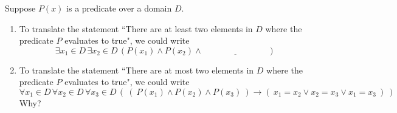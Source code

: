 
Suppose $P(x)$ is  a predicate over a domain $D$.
\begin{enumerate}
    \item To translate the statement
    ``There are at least two  elements in $D$
    where the predicate $P$ evaluates to true", we
    could  write
    \[
    \exists  x_1 \in D \, \exists x_2 \in D  \, (P(x_1) \wedge P(x_2) \wedge \underline{\phantom{\text{FILL IN BLANK}}})
    \]
    \vfill
    \item  To translate the statement
    ``There are at most two  elements in $D$
    where the predicate $P$ evaluates to true", we
    could write
    \[
    \forall  x_1 \in D \, \forall x_2 \in D \, \forall x_3 \in  D \, \left(~ (~P(x_1) \wedge P(x_2)  \wedge P(x_3) ~) \to (~ x_1 = x_2 \vee x_2 = x_3 \vee x_1 = x_3~)~\right)
    \]
    Why?
    \vfill
\end{enumerate}